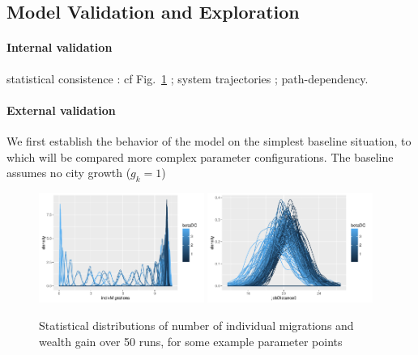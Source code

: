 \subsection{Model Validation and Exploration}

\paragraph{Internal validation} 

statistical consistence : cf Fig.~\ref{fig:statistical-valid} ; system trajectories ; path-dependency.


\paragraph{External validation}

We first establish the behavior of the model on the simplest baseline situation, to which will be compared more complex parameter configurations. The baseline assumes no city growth ($g_k=1$)


\begin{figure}
\centering
\includegraphics[width=0.48\textwidth]{figures/baseline_hist_indivMigrations_colorbetaDC}
\includegraphics[width=0.48\textwidth]{figures/baseline_hist_jobDistance0_colorbetaDC}
\caption{Statistical distributions of number of individual migrations and wealth gain over 50 runs, for some example parameter points}
\label{fig:statistical-valid}
\end{figure}



